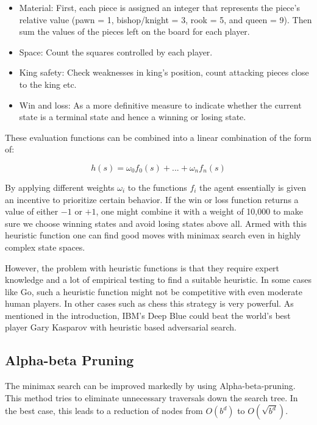 \begin{itemize}
    \item Material: First, each piece is assigned an integer that represents the piece's relative value (pawn = 1, bishop/knight = 3, rook = 5, and queen = 9). Then sum the values of the pieces left on the board for each player.
    \item Space: Count the squares controlled by each player.
    \item King safety: Check weaknesses in king's position, count attacking pieces close to the king etc.
    \item Win and loss: As a more definitive measure to indicate whether the current state is a terminal state and hence a winning or losing state.
\end{itemize}

These evaluation functions can be combined into a linear combination of the form of:

\begin{equation}
    h(s) = \omega_0f_0(s) + ... + \omega_nf_n(s)
\end{equation}

By applying different weights $ \omega_i $ to the functions $ f_i $ the agent essentially is given an incentive to prioritize certain behavior. If the win or loss function returns a value of either $-1$ or $+1$, one might combine it with a weight of 10,000 to make sure we choose winning states and avoid losing states above all. Armed with this heuristic function one can find good moves with minimax search even in highly complex state spaces.

However, the problem with heuristic functions is that they require expert knowledge and a lot of empirical testing to find a suitable heuristic. In some cases like Go, such a heuristic function might not be competitive with even moderate human players. In other cases such as chess this strategy is very powerful. As mentioned in the introduction, IBM's Deep Blue could beat the world's best player Gary Kasparov with heuristic based adversarial search.

\subsection{Alpha-beta Pruning}
The minimax search can be improved markedly by using Alpha-beta-pruning. This method tries to eliminate unnecessary traversals down the search tree. In the best case, this leads to a reduction of nodes from $ O(b^d) $ to $ O(\sqrt{b^d}) $.

